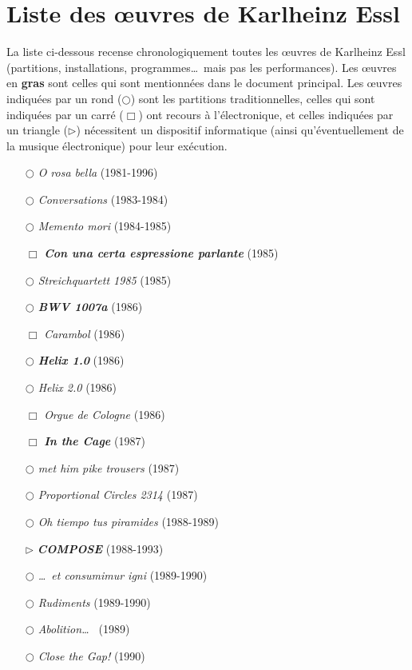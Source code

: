 \documentclass[a4paper,12pt]{article}
\begin{document}
\newpage
\section{Liste des œuvres de Karlheinz Essl}

La liste ci-dessous recense chronologiquement toutes les œuvres de Karlheinz Essl (partitions, installations, programmes\dots~mais pas les performances). Les œuvres en \textbf{gras} sont celles qui sont mentionnées dans le document principal. Les œuvres indiquées par un rond ($\bigcirc$) sont les partitions traditionnelles, celles qui sont indiquées par un carré ($\Box$) ont recours à l'électronique, et celles indiquées par un triangle ($\rhd$) nécessitent un dispositif informatique (ainsi qu'éventuellement de la musique électronique) pour leur exécution.

\begin{itemize}
\item[$\bigcirc$] \emph{O rosa bella} (1981-1996)
\item[$\bigcirc$] \emph{Conversations} (1983-1984)
\item[$\bigcirc$] \emph{Memento mori} (1984-1985)
\item[$\Box$] \textbf{\emph{Con una certa espressione parlante}} (1985)
\item[$\bigcirc$] \emph{Streichquartett 1985} (1985)
\item[$\bigcirc$] \textbf{\emph{BWV 1007a}} (1986)
\item[$\Box$] \emph{Carambol} (1986)
\item[$\bigcirc$] \textbf{\emph{Helix 1.0}} (1986)
\item[$\bigcirc$] \emph{Helix 2.0} (1986)
\item[$\Box$] \emph{Orgue de Cologne} (1986)
\item[$\Box$] \textbf{\emph{In the Cage}} (1987)
\item[$\bigcirc$] \emph{met him pike trousers} (1987)
\item[$\bigcirc$] \emph{Proportional Circles 2314} (1987)
\item[$\bigcirc$] \emph{Oh tiempo tus piramides} (1988-1989)
\item[$\rhd$] \textbf{\emph{COMPOSE}} (1988-1993)
\item[$\bigcirc$] \emph{\dots~et consumimur igni} (1989-1990)
\item[$\bigcirc$] \emph{Rudiments} (1989-1990)
\item[$\bigcirc$] \emph{Abolition\dots~} (1989)
\item[$\bigcirc$] \emph{Close the Gap!} (1990)

\end{itemize}
\end{document}
